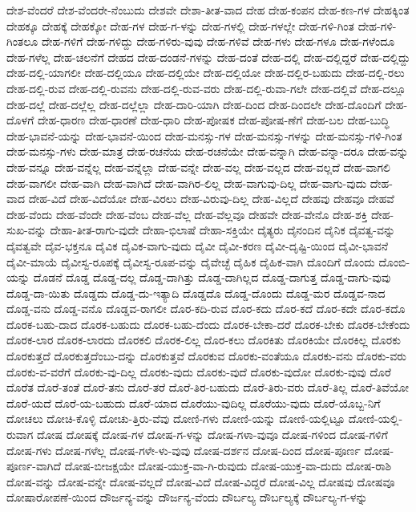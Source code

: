 {ದೇಶ-ವೆಂದರೆ
ದೇಶ-ವೆಂದರೇ-ನೆಂಬುದು
ದೇಶವೇ
ದೇಶಾ-ತೀತ-ವಾದ
ದೇಹ
ದೇಹ-ಕಂಪನ
ದೇಹ-ಕಣ-ಗಳ
ದೇಹಕ್ಕಿಂತ
ದೇಹಕ್ಕೂ
ದೇಹಕ್ಕೆ
ದೇಹಕ್ಕೋ
ದೇಹ-ಗಳ
ದೇಹ-ಗ-ಳನ್ನು
ದೇಹ-ಗಳಲ್ಲಿ
ದೇಹ-ಗಳಲ್ಲೇ
ದೇಹ-ಗಳಿ-ಗಿಂತ
ದೇಹ-ಗಳಿ-ಗಿಂತಲೂ
ದೇಹ-ಗಳಿಗೆ
ದೇಹ-ಗಳಿದ್ದು
ದೇಹ-ಗಳಿರು-ವುವು
ದೇಹ-ಗಳಿವೆ
ದೇಹ-ಗಳು
ದೇಹ-ಗಳೂ
ದೇಹ-ಗಳೆಂದೂ
ದೇಹ-ಗಳೆಲ್ಲ
ದೇಹ-ಚಲನೆಗೆ
ದೇಹದ
ದೇಹ-ದಂಡನೆ-ಗಳನ್ನು
ದೇಹ-ದಂತೆ
ದೇಹ-ದಲ್ಲಿ
ದೇಹ-ದಲ್ಲಿದ್ದರೆ
ದೇಹ-ದಲ್ಲಿದ್ದು
ದೇಹ-ದಲ್ಲಿ-ಯಾಗಲೀ
ದೇಹ-ದಲ್ಲಿಯೂ
ದೇಹ-ದಲ್ಲಿಯೇ
ದೇಹ-ದಲ್ಲಿಯೋ
ದೇಹ-ದಲ್ಲಿರ-ಬಹುದು
ದೇಹ-ದಲ್ಲಿ-ರಲು
ದೇಹ-ದಲ್ಲಿ-ರುವ
ದೇಹ-ದಲ್ಲಿ-ರುವನು
ದೇಹ-ದಲ್ಲಿ-ರುವ-ವರು
ದೇಹ-ದಲ್ಲಿ-ರುವಾ-ಗಲೇ
ದೇಹ-ದಲ್ಲಿವೆ
ದೇಹ-ದಲ್ಲೂ
ದೇಹ-ದಲ್ಲೆ
ದೇಹ-ದಲ್ಲೆಲ್ಲ
ದೇಹ-ದಲ್ಲೆಲ್ಲಾ
ದೇಹ-ದಾರಿ-ಯಾಗಿ
ದೇಹ-ದಿಂದ
ದೇಹ-ದಿಂದಲೇ
ದೇಹ-ದೊಂದಿಗೆ
ದೇಹ-ದೊಳಗೆ
ದೇಹ-ಧಾರಣ
ದೇಹ-ಧಾರಣೆ
ದೇಹ-ಧಾರಿ
ದೇಹ-ಪೋಷಕ
ದೇಹ-ಪೋಷ-ಣೆಗೆ
ದೇಹ-ಬಲ
ದೇಹ-ಬುದ್ಧಿ
ದೇಹ-ಭಾವನೆ-ಯನ್ನು
ದೇಹ-ಭಾವನೆ-ಯಿಂದ
ದೇಹ-ಮನಸ್ಸು-ಗಳ
ದೇಹ-ಮನಸ್ಸು-ಗಳನ್ನು
ದೇಹ-ಮನಸ್ಸು-ಗಳಿ-ಗಿಂತ
ದೇಹ-ಮನಸ್ಸು-ಗಳು
ದೇಹ-ಮಾತ್ರ
ದೇಹ-ರಚನೆಯ
ದೇಹ-ರಚನೆಯೇ
ದೇಹ-ವನ್ನಾಗಿ
ದೇಹ-ವನ್ನಾ-ದರೂ
ದೇಹ-ವನ್ನು
ದೇಹ-ವನ್ನೂ
ದೇಹ-ವನ್ನೆಲ್ಲ
ದೇಹ-ವನ್ನೆಲ್ಲಾ
ದೇಹ-ವನ್ನೇ
ದೇಹ-ವಲ್ಲ
ದೇಹ-ವಲ್ಲದ
ದೇಹ-ವಲ್ಲದೆ
ದೇಹ-ವಾಗಲಿ
ದೇಹ-ವಾಗಲೀ
ದೇಹ-ವಾಗಿ
ದೇಹ-ವಾಗಿದೆ
ದೇಹ-ವಾಗಿರ-ಲಿಲ್ಲ
ದೇಹ-ವಾಗುವು-ದಿಲ್ಲ
ದೇಹ-ವಾಗು-ವುದು
ದೇಹ-ವಾದ
ದೇಹ-ವಿದೆ
ದೇಹ-ವಿದೆಯೋ
ದೇಹ-ವಿರಲು
ದೇಹ-ವಿರುವು-ದಿಲ್ಲ
ದೇಹ-ವಿಲ್ಲದೆ
ದೇಹವು
ದೇಹವೂ
ದೇಹವೆ
ದೇಹ-ವೆಂದು
ದೇಹ-ವೆಂದೇ
ದೇಹ-ವೆಂಬ
ದೇಹ-ವೆಲ್ಲ
ದೇಹ-ವೆಲ್ಲವೂ
ದೇಹವೇ
ದೇಹ-ವೇನೊ
ದೇಹ-ಶಕ್ತಿ
ದೇಹ-ಸುಖ-ವನ್ನು
ದೇಹಾ-ತೀತ-ರಾಗು-ವುದೇ
ದೇಹಾ-ಭಿಲಾಷೆ
ದೇಹಾ-ಸಕ್ತಿಯೇ
ದೈತ್ಯರು
ದೈನಂದಿನ
ದೈನಿಕ
ದೈವತ್ವ-ವನ್ನು
ದೈವತ್ವವೇ
ದೈವ-ಭಕ್ತನೂ
ದೈವಿಕ
ದೈವಿಕ-ವಾಗು-ವುದು
ದೈವೀ
ದೈವೀ-ಕರಣ
ದೈವೀ-ದೃಷ್ಟಿ-ಯಿಂದ
ದೈವೀ-ಭಾವನೆ
ದೈವೀ-ಮಾಯೆ
ದೈವೀಸ್ವ-ರೂಪಕ್ಕೆ
ದೈವೀಸ್ವ-ರೂಪ-ವನ್ನು
ದೈವೇಚ್ಛೆ
ದೈಹಿಕ
ದೈಹಿಕ-ವಾಗಿ
ದೊಂದಿಗೆ
ದೊಂದು
ದೊಂಬಿ-ಯನ್ನು
ದೊಡನೆ
ದೊಡ್ಡ
ದೊಡ್ಡ-ದಲ್ಲ
ದೊಡ್ಡ-ದಾಗಿತ್ತು
ದೊಡ್ಡ-ದಾಗಿಲ್ಲದ
ದೊಡ್ಡ-ದಾಗುತ್ತ
ದೊಡ್ಡ-ದಾಗು-ವುವು
ದೊಡ್ಡ-ದಾ-ಯಿತು
ದೊಡ್ಡದು
ದೊಡ್ಡ-ದು-ಇತ್ಯಾದಿ
ದೊಡ್ಡದೊ
ದೊಡ್ಡ-ದೊಂದು
ದೊಡ್ಡ-ಮರ
ದೊಡ್ಡವ-ನಾದ
ದೊಡ್ಡ-ವನು
ದೊಡ್ಡ-ವನೊ
ದೊಡ್ಡವ-ರಾಗಲೀ
ದೊರ-ಕದಿ-ರುವ
ದೊರ-ಕದು
ದೊರ-ಕದೆ
ದೊರ-ಕದೇ
ದೊರ-ಕದೊ
ದೊರಕ-ಬಹು-ದಾದ
ದೊರಕ-ಬಹುದು
ದೊರಕ-ಬಹು-ದೆಂದು
ದೊರಕ-ಬೇಕಾ-ದರೆ
ದೊರಕ-ಬೇಕು
ದೊರಕ-ಬೇಕೆಂದು
ದೊರಕ-ಲಾರ
ದೊರಕ-ಲಾರದು
ದೊರಕಲಿ
ದೊರಕ-ಲಿಲ್ಲ
ದೊರ-ಕಲು
ದೊರಕಿತು
ದೊರಕಿಯೇ
ದೊರಕಿಲ್ಲ
ದೊರಕು
ದೊರಕುತ್ತದೆ
ದೊರಕುತ್ತದೆಂಬು-ದನ್ನು
ದೊರಕುತ್ತವೆ
ದೊರಕುವ
ದೊರಕು-ವಂತೆಯೂ
ದೊರಕು-ವನು
ದೊರಕು-ವರು
ದೊರಕು-ವ-ವರೆಗೆ
ದೊರಕು-ವು-ದಿಲ್ಲ
ದೊರಕು-ವುದು
ದೊರಕು-ವುದೆ
ದೊರಕು-ವುದೋ
ದೊರಕು-ವುವು
ದೊರೆ
ದೊರೆತ
ದೊರೆ-ತಂತೆ
ದೊರೆ-ತನು
ದೊರೆ-ತರೆ
ದೊರೆ-ತಿರ-ಬಹುದು
ದೊರೆ-ತಿರು-ವರು
ದೊರೆ-ತಿಲ್ಲ
ದೊರೆ-ತಿವೆಯೋ
ದೊರೆ-ಯದೆ
ದೊರೆ-ಯ-ಬಹುದು
ದೊರೆ-ಯಾದ
ದೊರೆಯು-ವುದಿಲ್ಲ
ದೊರೆಯು-ವುದು
ದೊರೆ-ಯೊಬ್ಬ-ನಿಗೆ
ದೋಚಲು
ದೋಚಿ-ಕೊಳ್ಳಿ
ದೋಚು-ತ್ತಿರು-ವೆವು
ದೋಣಿ-ಗಳು
ದೋಣಿ-ಯನ್ನು
ದೋಣಿ-ಯಲ್ಲಿಟ್ಟೂ
ದೋಣಿ-ಯಲ್ಲಿ-ರುವಾಗ
ದೋಷ
ದೋಷಕ್ಕೆ
ದೋಷ-ಗಳ
ದೋಷ-ಗ-ಳನ್ನು
ದೋಷ-ಗಳಾ-ವುವೂ
ದೋಷ-ಗಳಿಂದ
ದೋಷ-ಗಳಿಗೆ
ದೋಷ-ಗಳು
ದೋಷ-ಗಳೆಲ್ಲ
ದೋಷ-ಗಳೇ-ಳು-ವುವು
ದೋಷ-ದರ್ಶನ
ದೋಷ-ದಿಂದ
ದೋಷ-ಪೂರ್ಣ
ದೋಷ-ಪೂರ್ಣ-ವಾಗಿದೆ
ದೋಷ-ಬೀಜಕ್ಷಯೇ
ದೋಷ-ಯುಕ್ತ-ವಾ-ಗಿ-ರುವುದು
ದೋಷ-ಯುಕ್ತ-ವಾ-ದುದು
ದೋಷ-ರಾಶಿ
ದೋಷ-ವನ್ನು
ದೋಷ-ವನ್ನೇ
ದೋಷ-ವಲ್ಲದೆ
ದೋಷ-ವಿದೆ
ದೋಷ-ವಿದ್ದರೆ
ದೋಷ-ವಿಲ್ಲ
ದೋಷವು
ದೋಷವೂ
ದೋಷಾರೋಪಣೆ-ಯಿಂದ
ದೌರ್ಜನ್ಯ-ವನ್ನು
ದೌರ್ಜನ್ಯ-ವೆಂದು
ದೌರ್ಬಲ್ಯ
ದೌರ್ಬಲ್ಯಕ್ಕೆ
ದೌರ್ಬಲ್ಯ-ಗ-ಳನ್ನು
}
